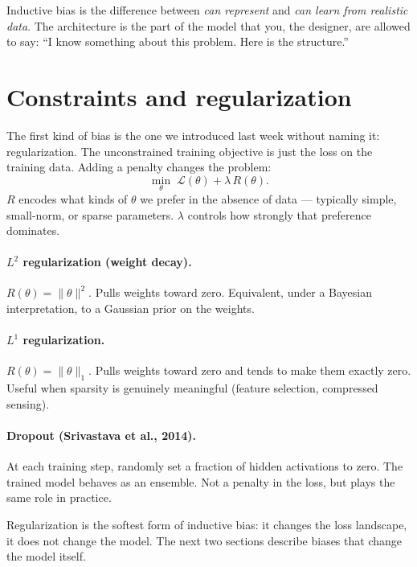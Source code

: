 \begin{intuition}
Inductive bias is the difference between \emph{can represent} and \emph{can learn from realistic data}. The architecture is the part of the model that you, the designer, are allowed to say: ``I know something about this problem. Here is the structure.''
\end{intuition}

\section{Constraints and regularization}

The first kind of bias is the one we introduced last week without naming it: regularization. The unconstrained training objective is just the loss on the training data. Adding a penalty changes the problem:
\[
\min_\theta \; \mathcal{L}(\theta) + \lambda \, R(\theta).
\]
$R$ encodes what kinds of $\theta$ we prefer in the absence of data --- typically simple, small-norm, or sparse parameters. $\lambda$ controls how strongly that preference dominates.

\paragraph{$L^2$ regularization (weight decay).} $R(\theta) = \|\theta\|^2$. Pulls weights toward zero. Equivalent, under a Bayesian interpretation, to a Gaussian prior on the weights.

\paragraph{$L^1$ regularization.} $R(\theta) = \|\theta\|_1$. Pulls weights toward zero and tends to make them exactly zero. Useful when sparsity is genuinely meaningful (feature selection, compressed sensing).

\paragraph{Dropout (Srivastava et al., 2014).} At each training step, randomly set a fraction of hidden activations to zero. The trained model behaves as an ensemble. Not a penalty in the loss, but plays the same role in practice.

Regularization is the softest form of inductive bias: it changes the loss landscape, it does not change the model. The next two sections describe biases that change the model itself.


